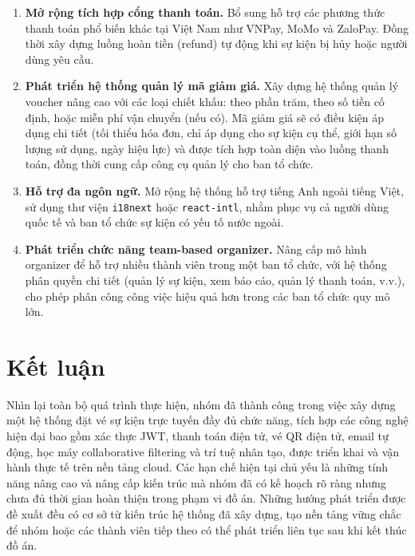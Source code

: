 \begin{enumerate}[leftmargin=*, label=\textbf{\arabic*.}]
    \item \textbf{Mở rộng tích hợp cổng thanh toán.}
    Bổ sung hỗ trợ các phương thức thanh toán phổ biến khác tại Việt
    Nam như VNPay, MoMo và ZaloPay. Đồng thời xây dựng luồng hoàn tiền
    (refund) tự động khi sự kiện bị hủy hoặc người dùng yêu cầu.

    \item \textbf{Phát triển hệ thống quản lý mã giảm giá.}
    Xây dựng hệ thống quản lý voucher nâng cao với các loại chiết khấu:
    theo phần trăm, theo số tiền cố định, hoặc miễn phí vận chuyển (nếu có).
    Mã giảm giá sẽ có điều kiện áp dụng chi tiết (tối thiểu hóa đơn, chỉ
    áp dụng cho sự kiện cụ thể, giới hạn số lượng sử dụng, ngày hiệu lực)
    và được tích hợp toàn diện vào luồng thanh toán, đồng thời cung cấp
    công cụ quản lý cho ban tổ chức.

    \item \textbf{Hỗ trợ đa ngôn ngữ.}
    Mở rộng hệ thống hỗ trợ tiếng Anh ngoài tiếng Việt, sử dụng thư
    viện \texttt{i18next} hoặc \texttt{react-intl}, nhằm phục vụ cả
    người dùng quốc tế và ban tổ chức sự kiện có yếu tố nước ngoài.

    \item \textbf{Phát triển chức năng team-based organizer.}
    Nâng cấp mô hình organizer để hỗ trợ nhiều thành viên trong một
    ban tổ chức, với hệ thống phân quyền chi tiết (quản lý sự kiện,
    xem báo cáo, quản lý thanh toán, v.v.), cho phép phân công công
    việc hiệu quả hơn trong các ban tổ chức quy mô lớn.

\end{enumerate}

\section*{Kết luận}

\indent \indent Nhìn lại toàn bộ quá trình thực hiện, nhóm
đã thành công trong việc xây dựng một hệ thống đặt vé sự kiện trực tuyến
đầy đủ chức năng, tích hợp các công nghệ hiện đại bao gồm xác thực JWT,
thanh toán điện tử, vé QR điện tử, email tự động, học máy collaborative filtering
và trí tuệ nhân tạo, được triển khai và vận hành thực tế trên nền tảng cloud.
Các hạn chế hiện tại chủ yếu là những tính năng nâng cao và nâng cấp kiến trúc
mà nhóm đã có kế hoạch rõ ràng nhưng chưa đủ thời gian hoàn thiện trong phạm vi
đồ án. Những hướng phát triển được đề xuất đều có cơ sở từ kiến trúc hệ thống
đã xây dựng, tạo nền tảng vững chắc để nhóm hoặc các thành viên tiếp theo có
thể phát triển liên tục sau khi kết thúc đồ án.